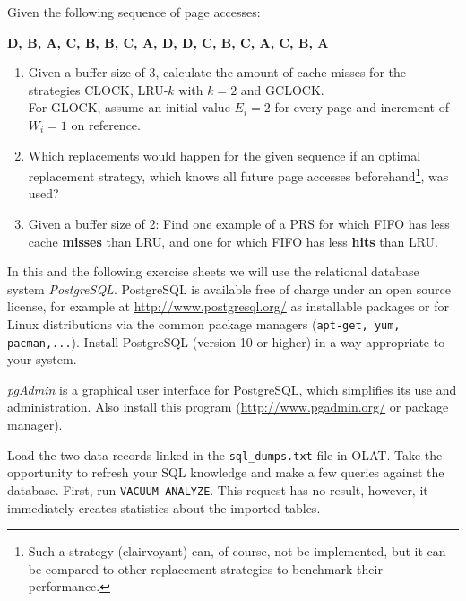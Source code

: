 
Given the following sequence of page accesses:

\begin{center}
  {\bf D, B, A, C, B, B, C, A, D, D, C, B, C, A, C, B, A}
\end{center}
\begin{enumerate}
  \item Given a buffer size of 3, calculate the amount of cache misses for the strategies CLOCK, LRU-$k$ with $k=2$ and GCLOCK.\\
        For GLOCK, assume an initial value $E_i=2$ for every page and increment of $W_i = 1$ on reference.

  \item Which replacements would happen for the given sequence if an optimal replacement strategy, which knows all future page accesses beforehand\footnote{Such a strategy (clairvoyant) can, of course, not be implemented, but it can be compared to other replacement strategies to benchmark their performance.}, was used?

  \item Given a buffer size of 2:
        Find one example of a PRS for which FIFO has less cache {\bf misses} than LRU, 
        and one for which FIFO has less {\bf hits} than LRU. 

\end{enumerate}

\newpage


In this and the following exercise sheets we will use the relational database system {\it PostgreSQL}.
PostgreSQL is available free of charge under an open source license,
for example at \url{http://www.postgresql.org/} as installable packages or
for Linux distributions via the common package managers ({\tt apt-get, yum, pacman,...}).
Install PostgreSQL (version 10 or higher) in a way appropriate to your system.

  {\it pgAdmin} is a graphical user interface for PostgreSQL, which simplifies its use and administration.
Also install this program (\url{http://www.pgadmin.org/} or package manager).

Load the two data records linked in the \texttt{sql\_dumps.txt} file in OLAT.
Take the opportunity to refresh your SQL knowledge and make a few queries against the database.
First, run {\tt VACUUM ANALYZE}. This request has no result, however, it immediately creates statistics about the imported tables.

